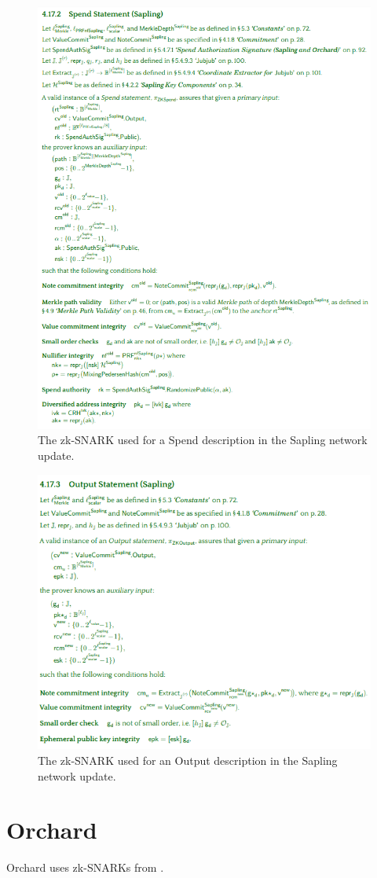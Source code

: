 \documentclass{article}
\begin{document}
\begin{figure}[t]
\includegraphics[width=\textwidth]{spend-zksnark.png}
\caption{The zk-SNARK used for a Spend description in the Sapling network update. \cite{hopwood:zcash}}
\centering
\end{figure}

\begin{figure}[t]
\includegraphics[width=\textwidth]{output-zksnark.png}
\caption{The zk-SNARK used for an Output description in the Sapling network update. \cite{hopwood:zcash}}
\centering
\end{figure}

\section{Orchard}

Orchard uses zk-SNARKs from \cite{zcash:halo2}.



\end{document}
